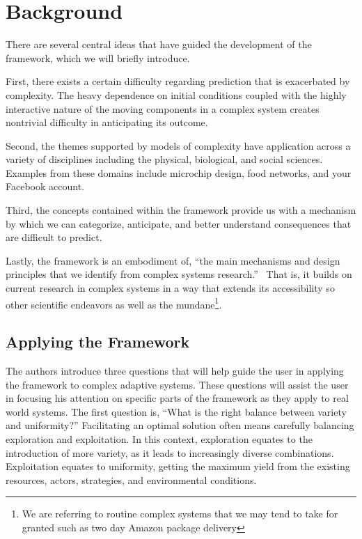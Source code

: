 \documentclass[jou,apacite]{apa6}
\begin{document}
\section{Background}

There are several central ideas that have guided the development of the framework, which we will briefly introduce.

First, there exists a certain difficulty regarding prediction that is exacerbated by complexity.  The heavy dependence on initial conditions coupled with the highly interactive nature of the moving components in a complex system creates nontrivial difficulty in anticipating its outcome.

Second, the themes supported by models of complexity have application across a variety of disciplines including the physical, biological, and social sciences.  Examples from these domains include microchip design, food networks, and your Facebook account.

Third, the concepts contained within the framework provide us with a mechanism by which we can categorize, anticipate, and better understand consequences that are difficult to predict.

Lastly, the framework is an embodiment of, ``the main mechanisms and design principles that we identify from complex systems research.''~\cite[page 2]{Axelrod}  That is, it builds on current research in complex systems in a way that extends its accessibility so other scientific endeavors as well as the mundane\footnote{We are referring to routine complex systems that we may tend to take for granted such as two day Amazon package delivery}.

\subsection{Applying the Framework}

The authors introduce three questions that will help guide the user in applying the framework to complex adaptive systems.  These questions will assist the user in focusing his attention on specific parts of the framework as they apply to real world systems.  The first question is, ``What is the right balance between variety and uniformity?''  Facilitating an optimal solution often means carefully balancing exploration and exploitation.  In this context, exploration equates to the
introduction of more variety, as it leads to increasingly diverse combinations.  Exploitation equates to uniformity, getting the maximum yield from the existing resources, actors, strategies, and environmental conditions.
\end{document}
